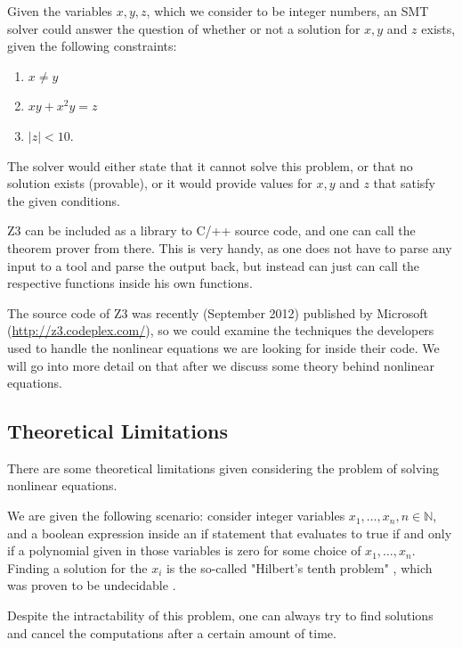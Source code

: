 \documentclass[oribibl]{llncs}
\newcommand{\NN}{{\mathbb{N}}}
\begin{document}
\begin{example}
  Given the variables $x,y,z$, which we consider to
  be integer numbers, an SMT solver could answer the question of whether or not
  a solution for $x,y$ and $z$ exists, given the following
  constraints:
  \begin{enumerate}
    \item $x \neq y$
    \item $xy+x^2y=z$
    \item $|z|<10$.
  \end{enumerate}
  The solver would either state that it cannot solve this problem, or
  that no solution exists (provable), or it would provide values for
  $x,y$ and $z$ that satisfy the given conditions.
\end{example}

\textsc{Z3} can be included as a library to \textsc{C}/\textsc{++} source code, and one
can call the theorem prover from there. This is very handy, as one does
not have to parse any input to a tool and parse the output back, but instead can
just can call the respective functions inside his own functions.

The source code of \textsc{Z3} was recently (September 2012) published
by Microsoft (\url{http://z3.codeplex.com/}), so we could examine the
techniques the developers used to handle the nonlinear equations we
are looking for inside their code. We will go into more detail on that
after we discuss some theory behind nonlinear equations.

\subsection{Theoretical Limitations}

There are some theoretical limitations given considering the problem
of solving nonlinear equations.

We are given the following scenario: consider integer variables $x_1, \ldots,
x_n, n \in \NN$, and a boolean expression inside an if statement that
evaluates to true if and only if a polynomial given in those variables
is zero for some choice of $x_1, \ldots, x_n$. Finding a solution for
the $x_i$ is the so-called "Hilbert's tenth problem"
\cite{davis1984hilbert}, which was proven to be undecidable
\cite{matiyasevich1970enumerable}.

Despite the intractability of this problem, one can always try to find solutions and cancel the
computations after a certain amount of time.
\end{document}

